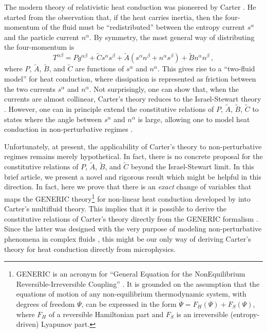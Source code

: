 \documentclass[a4paper, amsfonts, amssymb, amsmath, reprint, showkeys, nofootinbib, twoside, onecolumn, notitlepage]{revtex4-1}
\begin{document}
The modern theory of relativistic heat conduction was pioneered by Carter \cite{noto_rel,Lopez09}. He started from the observation that, if the heat carries inertia, then the four-momentum of the fluid must be ``redistributed'' between the entropy current $s^\alpha$ and the particle current $n^\alpha$. By symmetry, the most general way of distributing the four-momentum is
\begin{equation}\label{fuxi}
   T^{\alpha \beta}= Pg^{\alpha \beta} + \tilde{C} s^\alpha s^\beta +\tilde{A}(s^\alpha n^\beta{+}n^\alpha s^\beta)+\tilde{B} n^\alpha n^\beta \, ,
\end{equation}
where $P$, $\tilde{A}$, $\tilde{B}$, and $\tilde{C}$ are functions of $s^\alpha$ and $n^\alpha$. This gives rise to a ``two-fluid model'' for heat conduction, where dissipation is represented as friction between the two currents $s^\alpha$ and $n^\alpha$. Not surprisingly, one can show that, when the currents are almost collinear, Carter's theory reduces to the Israel-Stewart theory \cite{PriouCOMPAR1991,OlsonRegular1990,GavassinoStabilityCarter2022}. However, one can in principle extend the constitutive relations of $P$, $\tilde{A}$, $\tilde{B}$, $\tilde{C}$ to states where the angle between $s^\alpha$ and $n^\alpha$ is large, allowing one to model heat conduction in non-perturbative regimes \cite{GavassinoKhalatnikov2022}. 

Unfortunately, at present, the applicability of Carter's theory to non-perturbative regimes remains merely hypothetical. In fact, there is no concrete proposal for the constitutive relations of $P$, $\tilde{A}$, $\tilde{B}$, and $\tilde{C}$ beyond the Israel-Stewart limit. In this brief article, we present a novel and rigorous result which might be helpful in this direction. In fact, here we prove that there is an \textit{exact} change of variables that maps the GENERIC theory\footnote{GENERIC is an acronym for ``General Equation for the NonEquilibrium Reversible-Irreversible Coupling'' \cite{Grmela1997}. It is grounded on the assumption that the equations of motion of any non-equilibrium thermodynamic system, with degrees of freedom $\Psi$, can be expressed in the form $\dot{\Psi}{=}F_H(\Psi){+}F_S(\Psi)$, where $F_H$ of a reversible Hamiltonian part and $F_S$ is an irreversible (entropy-driven) Lyapunov part.} for non-linear heat conduction developed by \citet{OttingerSoloHeat1998} into Carter's multifluid theory. This implies that it is possible to derive the constitutive relations of Carter's theory directly from the GENERIC formalism \cite{Grmela1997,OttingerReview2018}. Since the latter was designed with the very purpose of modeling non-perturbative phenomena in complex fluids \cite{OttingerReview2018}, this might be our only way of deriving Carter's theory for heat conduction directly from microphysics.
\end{document}
